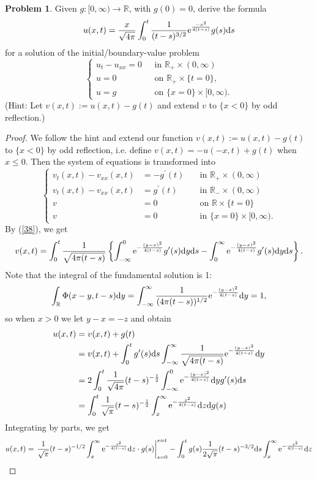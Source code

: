 \documentclass[hyperref,UTF8,12pt]{article}
\numberwithin{equation}{subsection}
\theoremstyle{plain}
\theoremstyle{definition}
\newtheorem{problem}{Problem}
\numberwithin{theorem}{section}
\numberwithin{lemma}{section}
\numberwithin{proposition}{section}
\numberwithin{remark}{section}
\numberwithin{corollary}{section}
\numberwithin{definition}{section}
\numberwithin{problem}{section}
\numberwithin{example}{section}
\def\e{\textup{e}}
\def\dif{\textup{d}}
\newcommand{\mr}{\mathbb{R}}
\renewcommand{\leq}{\leqslant}
\begin{document}
\begin{problem}
Given $g:[0,\infty)\to\mr$, with $g(0)=0$, derive the formula\[u(x,t)=\frac{x} {\sqrt{4\pi}}\int_0^t\frac{1}{(t-s)^{3/2}}\e^{\frac{-x^2}{4(t-s)}}g(s)\dif s\]for a solution of the initial/boundary-value problem\[\left\{\begin{aligned}
	u_t-u_{xx}=0&\text{~~in } \mr_+\times(0,\infty) \\
	u=0&\text{~~on }\mr_+\times\{t=0\},\\
	u=g&\text{~~on }\{x=0\}\times[0,\infty).
\end{aligned}\right.\]
(Hint: Let $v(x,t):=u(x,t)-g(t)$ and extend $v$ to $\{x<0\}$ by odd reflection.)
\end{problem}
\begin{proof}
We follow the hint and extend our function $v(x,t):=u(x,t)-g(t)$ to $\{x<0\}$ by odd reflection, i.e. define $v(x,t)=-u(-x,t)+g(t)$ when $x\leq0$. Then the system of equations is transformed into \[\left\{\begin{aligned}
	v_t(x,t)-v_{xx}(x,t)&=-g^\prime(t)\quad&\text{in } \mr_+\times(0,\infty)\\
	v_t(x,t)-v_{xx}(x,t)&=g^\prime(t)\quad&\text{in } \mr_-\times(0,\infty)\\
	v&=0\quad&\text{on } \mr\times\{t=0\}\\
	v&=0\quad&\text{in } \{x=0\}\times[0,\infty).
\end{aligned}\right.\]By (\ref{38}), we get \[v(x,t)=\int_0^t\frac{1}{\sqrt{4\pi(t-s)}}\left\{\int_{-\infty}^0\e^{-\frac{(y-x)^2}{4(t-s)}}g^\prime(s)\dif y\dif s-\int_0^\infty\e^{-\frac{(y-x)^2}{4(t-s)}}g^\prime(s)\dif y\dif s \right\}.\]Note that the integral of the fundamental solution is 1:\[\int_\mr\Phi(x-y,t-s)\dif y=\int_{-\infty}^\infty\frac{1}{(4\pi(t-s))^{1/2}}\e^{-\frac{(y-x)^2}{4(t-s)}}\dif y=1,\]so when $x>0$ we let $y-x=-z$ and obtain\[\begin{aligned}
	u(x,t)&=v(x,t)+g(t)\\&=v(x,t)+\int_0^tg^\prime(s)\dif s \int_{-\infty}^\infty\frac{1}{\sqrt{4\pi(t-s)}}\e^{-\frac{(y-x)^2}{4(t-s)}}\dif y\\
	&=2\int_0^t\frac{1}{\sqrt{4\pi}}(t-s)^{-\frac{1}{2}}\int_{-\infty}^0\e^{-\frac{(y-x)^2}{4(t-s)}}\dif yg^{\prime}(s)\dif s\\
	&=\int_0^t\frac{1}{\sqrt{\pi}}(t-s)^{-\frac{1}{2}}\int_x^\infty\e^{-\frac{z^2}{4(t-s)}}\dif z\dif g(s)
\end{aligned}\]Integrating by parts, we get\[\begin{aligned}
	&u(x,t)=\left.\frac{1}{\sqrt{\pi}}(t-s)^{-1/2}\int_x^\infty\e^{-\frac{z^2}{4(t-s)}}\dif z\cdot g(s)\right|_{s=0}^{s=t}-\int_0^tg(s)\frac{1}{2\sqrt{\pi}}(t-s)^{-3/2}\dif s\int_x^\infty \e^{-\frac{z^2}{4(t-s)}}\dif z\\

\end{aligned}\]
\end{proof}
\end{document}
